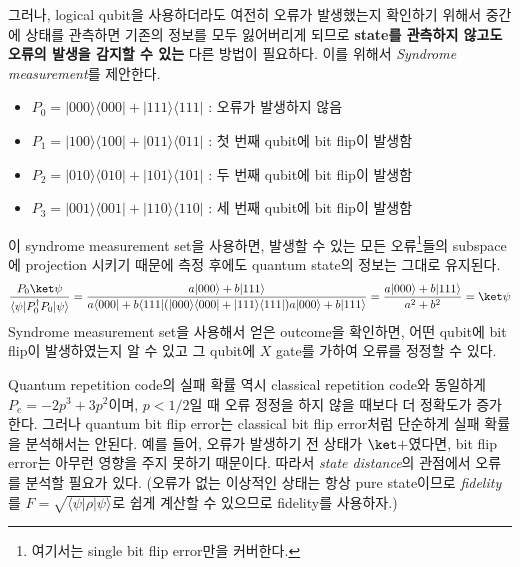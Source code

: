 그러나, logical qubit을 사용하더라도 여전히 오류가 발생했는지 확인하기 위해서 중간에 상태를 관측하면 기존의 정보를 모두 잃어버리게 되므로 \textbf{state를 관측하지 않고도 오류의 발생을 감지할 수 있는} 다른 방법이 필요하다.
이를 위해서 \textit{Syndrome measurement}를 제안한다. 
\begin{itemize}
    \item $P_0 = |000\rangle\langle 000| + |111\rangle\langle 111|$ : 오류가 발생하지 않음
    \item $P_1 = |100\rangle\langle 100| + |011\rangle\langle 011|$ : 첫 번째 qubit에 bit flip이 발생함
    \item $P_2 = |010\rangle\langle 010| + |101\rangle\langle 101|$ : 두 번째 qubit에 bit flip이 발생함
    \item $P_3 = |001\rangle\langle 001| + |110\rangle\langle 110|$ : 세 번째 qubit에 bit flip이 발생함
\end{itemize}

이 syndrome measurement set을 사용하면, 발생할 수 있는 모든 오류\footnote{여기서는 single bit flip error만을 커버한다.}들의 subspace에 projection 시키기 때문에 측정 후에도 quantum state의 정보는 그대로 유지된다. 
\begin{equation*}
    \frac{P_0 \ket \psi}{\langle \psi | P_0^\dagger P_0 | \psi \rangle } = \frac{a|000\rangle + b |111\rangle}{a\langle 000|+ b\langle 111| ( |000\rangle\langle 000| + |111\rangle\langle 111| )a|000\rangle+b|111\rangle} = \frac{a|000\rangle + b|111\rangle}{a^2 + b^2} = \ket \psi
\end{equation*}
Syndrome measurement set을 사용해서 얻은 outcome을 확인하면, 어떤 qubit에 bit flip이 발생하였는지 알 수 있고 그 qubit에 $X$ gate를 가하여 오류를 정정할 수 있다. 

\vspace{1em}

Quantum repetition code의 실패 확률 역시 classical repetition code와 동일하게 $P_e = - 2p^3 + 3p^2$이며, $p < 1/2$일 때 오류 정정을 하지 않을 때보다 더 정확도가 증가한다. 그러나 quantum bit flip error는 classical bit flip error처럼 단순하게 실패 확률을 분석해서는 안된다.
예를 들어, 오류가 발생하기 전 상태가 $\ket +$였다면, bit flip error는 아무런 영향을 주지 못하기 때문이다. 따라서 \textit{state distance}의 관점에서 오류를 분석할 필요가 있다. (오류가 없는 이상적인 상태는 항상 pure state이므로 \textit{fidelity}를 $F = \sqrt{\langle \psi | \rho | \psi \rangle}$로 쉽게 계산할 수 있으므로 fidelity를 사용하자.)

